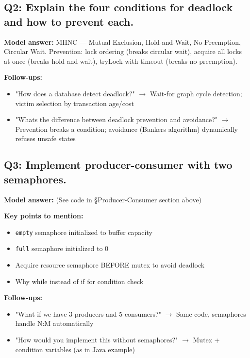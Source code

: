 \documentclass[11pt]{article}
\providecommand{\tightlist}{\setlength{\itemsep}{1pt}\setlength{\parskip}{0pt}}
\begin{document}
\subsection{Q2: Explain the four conditions for deadlock and how to prevent each.}\label{q2-explain-the-four-conditions-for-deadlock-and-how-to-prevent-each}

\textbf{Model answer:} MHNC --- Mutual Exclusion, Hold-and-Wait, No Preemption, Circular Wait. Prevention: lock ordering (breaks circular wait), acquire all locks at once (breaks hold-and-wait), tryLock with timeout (breaks no-preemption).

\textbf{Follow-ups:}

\begin{itemize}
\tightlist
\item
  "How does a database detect deadlock?" \(\rightarrow\) Wait-for graph cycle detection; victim selection by transaction age/cost
\item
  "What\textquotesingle s the difference between deadlock prevention and avoidance?" \(\rightarrow\) Prevention breaks a condition; avoidance (Banker\textquotesingle s algorithm) dynamically refuses unsafe states
\end{itemize}

\subsection{Q3: Implement producer-consumer with two semaphores.}\label{q3-implement-producer-consumer-with-two-semaphores}

\textbf{Model answer:} (See code in §Producer-Consumer section above)

\textbf{Key points to mention:}

\begin{itemize}
\tightlist
\item
  \texttt{empty} semaphore initialized to buffer capacity
\item
  \texttt{full} semaphore initialized to 0
\item
  Acquire resource semaphore BEFORE mutex to avoid deadlock
\item
  Why while instead of if for condition check
\end{itemize}

\textbf{Follow-ups:}

\begin{itemize}
\tightlist
\item
  "What if we have 3 producers and 5 consumers?" \(\rightarrow\) Same code, semaphores handle N:M automatically
\item
  "How would you implement this without semaphores?" \(\rightarrow\) Mutex + condition variables (as in Java example)
\end{itemize}
\end{document}
